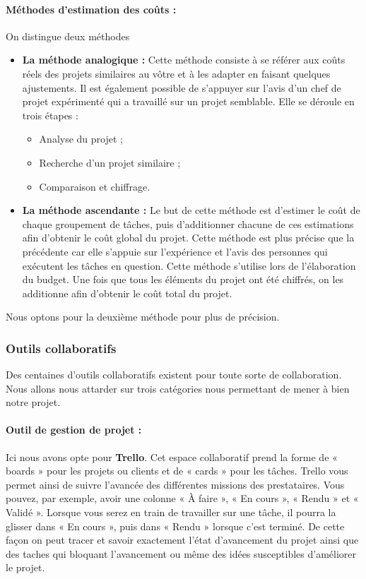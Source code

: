 \paragraph{Méthodes d’estimation des coûts : }On distingue deux méthodes
\begin{itemize}
    \item \textbf{La méthode analogique :} Cette méthode consiste à se référer aux coûts réels des projets similaires au vôtre et à les adapter en faisant quelques ajustements. Il est également possible de s’appuyer sur l’avis d’un chef de projet expérimenté qui a travaillé sur un projet semblable. Elle se déroule en trois étapes :
    \begin{itemize}
        \item Analyse du projet ;
        \item Recherche d’un projet similaire ;
        \item Comparaison et chiffrage.
    \end{itemize}
    \item \textbf{La méthode ascendante :} Le but de cette méthode est d’estimer le coût de chaque groupement de tâches, puis d’additionner chacune de ces estimations afin d’obtenir le coût global du projet. Cette méthode est plus précise que la précédente car elle s’appuie sur l’expérience et l’avis des personnes qui exécutent les tâches en question. Cette méthode s’utilise lors de l’élaboration du budget. Une fois que tous les éléments du projet ont été chiffrés, on les additionne afin d’obtenir le coût total du projet.
\end{itemize}

Nous optons pour la deuxième méthode pour plus de précision.

\subsubsection{Outils collaboratifs}
Des centaines d’outils collaboratifs existent pour toute sorte de collaboration. Nous allons nous attarder sur trois catégories nous permettant de mener à bien notre projet. 

\paragraph{Outil de gestion de projet : }Ici nous avons opte pour \textbf{Trello}. Cet espace collaboratif prend la forme de « boards » pour les projets ou clients et de « cards » pour les tâches. Trello vous permet ainsi de suivre l’avancée des différentes missions des prestataires. Vous pouvez, par exemple, avoir une colonne « À faire », « En cours », « Rendu » et « Validé ». Lorsque vous serez en train de travailler sur une tâche, il pourra la glisser dans « En cours », puis dans « Rendu » lorsque c’est terminé. De cette façon on peut tracer et savoir exactement l’état d’avancement du projet ainsi que des taches qui bloquant l’avancement ou même des idées susceptibles d’améliorer le projet.

